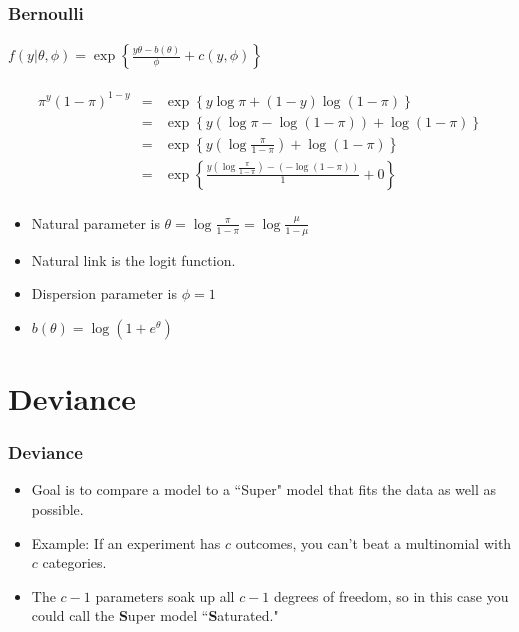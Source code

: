 \documentclass[serif]{beamer} %
\begin{document}
\begin{frame}
\frametitle{Bernoulli}
\framesubtitle{$ f(y|\theta,\phi) = 
    \exp\left\{ \frac{y\theta-b(\theta)}{\phi} + c(y,\phi)\right\}$} 

\begin{eqnarray*}
    \pi^y (1-\pi)^{1-y} 
    & = & \exp\left\{ y\log\pi + (1-y)\log(1-\pi) \right\}\\
    & = &  \exp\left\{ y\left(\log\pi-\log(1-\pi)\right) + \log(1-\pi)\right\} \\
    & = &  \exp\left\{ y\left(\log\frac{\pi}{1-\pi}\right) + \log(1-\pi)\right\} \\
    & = &  \exp\left\{ \frac{y\left(\log\frac{\pi}{1-\pi}\right) - (-\log(1-\pi))}{1} + 0
\right\} \\
\end{eqnarray*} 
  \begin{itemize}
    \item Natural parameter is $\theta=\log\frac{\pi}{1-\pi} = \log\frac{\mu}{1-\mu}$
    \item Natural link is the logit function.
    \item Dispersion parameter is $\phi=1$
    \item $b(\theta) = \log(1+e^\theta)$
  \end{itemize}

\end{frame}


\section{Deviance} %

\begin{frame}
\frametitle{Deviance}
  \begin{itemize}
    \item Goal is to compare a model to a ``Super" model that fits the data as well as possible.
    \item Example: If an experiment has $c$ outcomes, you can't beat a multinomial with $c$ categories. 
    \item The $c-1$ parameters soak up all $c-1$ degrees of freedom, so in this case you could call the \textbf{S}uper model ``\textbf{S}aturated."
  \end{itemize}
\end{frame}
\end{document}
